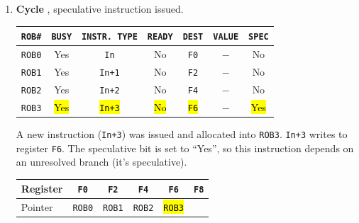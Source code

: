 \begin{examplebox}
\begin{enumerate}
        \item \textbf{Cycle \theenumi}, speculative instruction issued.
        \begin{center}
            \begin{tabular}{@{} c | c | c | c | c | c | c @{}}
                \toprule
                \texttt{ROB\#} & \texttt{BUSY} & \texttt{INSTR. TYPE} & \texttt{READY} & \texttt{DEST} & \texttt{VALUE} & \texttt{SPEC} \\
                \midrule
                \texttt{ROB0} & Yes         & \texttt{In}           & No        & \texttt{F0}       & $-$     & No          \\ [.3em]
                \texttt{ROB1} & Yes         & \texttt{In+1}         & No        & \texttt{F2}       & $-$     & No          \\ [.3em]
                \texttt{ROB2} & Yes         & \texttt{In+2}         & No        & \texttt{F4}       & $-$     & No          \\ [.3em]
                \texttt{ROB3} & \hl{Yes}    & \hl{\texttt{In+3}}    & \hl{No}   & \hl{\texttt{F6}}  & $-$     & \hl{Yes}    \\
                \bottomrule
            \end{tabular}
        \end{center}
        A new instruction (\texttt{In+3}) was issued and allocated into \texttt{ROB3}. \texttt{In+3} writes to register \texttt{F6}. The speculative bit is set to ``Yes'', so this instruction depends on an unresolved branch (it's speculative).
        \begin{center}
            \begin{tabular}{@{} l | c c c c c @{}}
                \toprule
                Register    & \texttt{F0}   & \texttt{F2}   & \texttt{F4}           & \texttt{F6}           & \texttt{F8} \\
                \midrule
                Pointer     & \texttt{ROB0} & \texttt{ROB1} & \texttt{ROB2}         & \hl{\texttt{ROB3}}    &             \\
                \bottomrule
            \end{tabular}
        \end{center}



\end{enumerate}
\end{examplebox}
